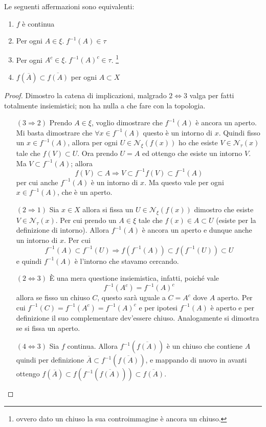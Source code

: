 \begin{theorem}
	Le seguenti affermazioni sono equivalenti:
	\begin{enumerate}
		\item $f$ è continua
		\item Per ogni $A \in \xi  . \; f^{-1}(A) \in \tau$
		\item Per ogni $A^c \in \xi  . \; f^{-1}(A)^c \in \tau$. \footnote{ovvero dato un chiuso la sua controimmagine è ancora un chiuso.}
		\item $f(\overline{A}) \subset \overline{f(A)}$ per ogni $A \subset X$
	\end{enumerate}
\end{theorem}
\begin{proof}
	Dimostro la catena di implicazioni, malgrado $2 \iff 3$ valga per fatti totalmente insiemistici; non ha nulla a che fare con la topologia.
	\begin{enumerate}
		\item[$(3\Rightarrow 2)$] Prendo $A \in \xi$, voglio dimostrare che $f^{-1}(A)$ è ancora un aperto. Mi basta dimostrare che $\forall x \in f^{-1}(A)$ questo è un intorno di $x$. Quindi fisso un $x \in f^{-1}(A)$, allora per ogni $U \in \mathcal{N}_\xi(f(x))$ ho che esiste $V \in \mathcal{N}_\tau(x)$ tale che $f(V) \subset U$. Ora prendo $U = A$ ed ottengo che esiste un intorno $V$. Ma $V \subset f^{-1}(A)$; allora
		\begin{equation*}
			f(V) \subset A \Longrightarrow V \subset f^{-1}f(V) \subset f^{-1}(A)
		\end{equation*}
		per cui anche $f^{-1}(A)$ è un intorno di $x$. Ma questo vale per ogni $x \in f^{-1}(A)$, che è un aperto.
		\item[$(2 \Rightarrow 1)$] Sia $x \in X$ allora si fissa un $U \in \mathcal{N}_\xi(f(x))$ dimostro che esiste $V \in \mathcal{N}_\tau(x)$. Per cui prendo un $A \in \xi$ tale che $f(x) \in A \subset U$ (esiste per la definizione di intorno). Allora $f^{-1}(A)$ è ancora un aperto e dunque anche un intorno di $x$. Per cui 
		\begin{equation*}
			f^{-1}(A) \subset f^{-1}(U) \Longrightarrow f(f^{-1}(A)) \subset f(f^{-1}(U)) \subset U
		\end{equation*}
		e quindi $f^{-1}(A)$ è l'intorno che stavamo cercando.
		\item[$(2 \Leftrightarrow 3)$] È una mera questione insiemistica, infatti, poiché vale 
		\begin{equation*}
			f^{-1}(A^c) = f^{-1}(A)^c
		\end{equation*}
		allora se fisso un chiuso $C$, questo sarà uguale a $C = A^c$ dove $A$ aperto. Per cui $f^{-1}(C) = f^{-1}(A^c) = f^{-1}(A)^c$ e per ipotesi $f^{-1}(A)$ è aperto e per definizione il suo complementare dev'essere chiuso. Analogamente si dimostra se si fissa un aperto.
		\item[$(4 \Leftrightarrow 3)$] Sia $f$ continua. Allora $f^{-1}(\overline{f(A)})$ è un chiuso che contiene $A$ quindi per definizione $\overline{A} \subset f^{-1}(\overline{f(A)})$, e mappando di nuovo in avanti ottengo 
		$f(\overline{A}) \subset f(f^{-1}(\overline{f(A)})) 
		\subset \overline{f(A)}$.\\
		

\end{enumerate}
\end{proof}
